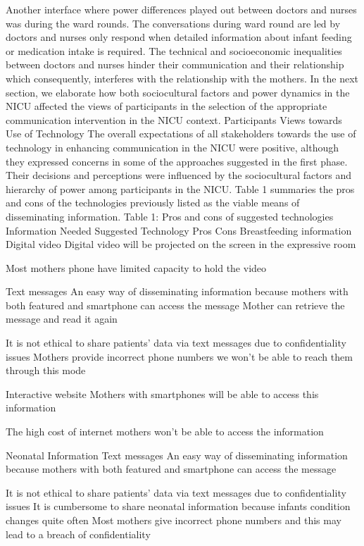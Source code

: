Another interface where power differences played out between doctors and nurses was during the ward rounds. The conversations during ward round are led by doctors and nurses only respond when detailed information about infant feeding or medication intake is required. The technical and socioeconomic inequalities between doctors and nurses hinder their communication and their relationship which consequently, interferes with the relationship with the mothers.
In the next section, we elaborate how both sociocultural factors and power dynamics in the NICU affected the views of participants in the selection of the appropriate communication intervention in the NICU context. 
Participants Views towards Use of Technology
The overall expectations of all stakeholders towards the use of technology in enhancing communication in the NICU were positive, although they expressed concerns in some of the approaches suggested in the first phase. Their decisions and perceptions were influenced by the sociocultural factors and hierarchy of power among participants in the NICU.
Table 1 summaries the pros and cons of the technologies previously listed as the viable means of disseminating information.
Table 1: Pros and cons of suggested technologies
Information Needed
Suggested Technology
Pros
Cons
Breastfeeding information
Digital video
Digital video will be projected on the screen in the expressive room

Most mothers phone have limited capacity to hold the video 

Text messages
An easy way of disseminating information because mothers with both featured and smartphone can access the message
Mother can retrieve the message and read it again


It is not ethical to share patients’ data via text messages due to confidentiality issues
Mothers provide incorrect phone numbers we won’t be able to reach them through this mode


Interactive website
Mothers with smartphones will be able to access this information 


The high cost of internet mothers won’t be able to access the information 

Neonatal Information
Text messages
An easy way of disseminating information because mothers with both featured and smartphone can access the message

It is not ethical to share patients’ data via text messages due to confidentiality issues
It is cumbersome to share neonatal information because infants condition changes quite often
Most mothers give incorrect phone numbers and this may lead to a breach of confidentiality

